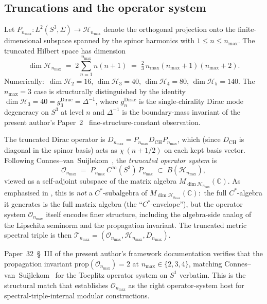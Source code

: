 \documentclass[11pt,a4paper]{article}
\theoremstyle{plain}
\theoremstyle{definition}
\newcommand{\nmax}{n_{\max}}
\newcommand{\sthree}{S^{3}}
\newcommand{\Hilb}{\mathcal{H}}
\newcommand{\Op}{\mathcal{O}}
\newcommand{\Tcal}{\mathcal{T}}
\newcommand{\C}{\mathbb{C}}
\newcommand{\Mat}{M}
\newcommand{\DCH}{D_{\mathrm{CH}}}
\begin{document}
\subsection{Truncations and the operator system}
\label{sec:truncations_recap}

Let $P_{\nmax}: L^2(\sthree, \Sigma) \to \Hilb_{\nmax}$ denote the
orthogonal projection onto the finite-dimensional subspace spanned by
the spinor harmonics with $1 \le n \le \nmax$. The truncated Hilbert
space has dimension
\begin{equation}\label{eq:dim_H_nmax}
   \dim \Hilb_{\nmax}
   \;=\; 2 \sum_{n=1}^{\nmax} n(n+1)
   \;=\; \tfrac{2}{3}\, \nmax(\nmax+1)(\nmax+2).
\end{equation}
Numerically:\ $\dim \Hilb_2 = 16$, $\dim \Hilb_3 = 40$,
$\dim \Hilb_4 = 80$, $\dim \Hilb_5 = 140$. The $\nmax = 3$ case is
structurally distinguished by the identity $\dim \Hilb_3 = 40 =
g_3^{\mathrm{Dirac}} = \Delta^{-1}$, where $g_n^{\mathrm{Dirac}}$ is
the single-chirality Dirac mode degeneracy on $\sthree$ at level $n$
and $\Delta^{-1}$ is the boundary-mass invariant of the present
author's Paper~2~\cite{paper2} fine-structure-constant observation.

The truncated Dirac operator is $D_{\nmax} = P_{\nmax} \DCH P_{\nmax}$,
which (since $\DCH$ is diagonal in the spinor basis) acts as
$\chi\,(n + 1/2)$ on each kept basis vector. Following
Connes--van~Suijlekom~\cite{connes_vs2021}, the \emph{truncated
operator system} is
\begin{equation}\label{eq:O_def}
   \Op_{\nmax}
   \;=\; P_{\nmax}\, C^\infty(\sthree)\, P_{\nmax}
   \;\subset\; B(\Hilb_{\nmax}),
\end{equation}
viewed as a self-adjoint subspace of the matrix algebra
$\Mat_{\dim \Hilb_{\nmax}}(\C)$. As emphasised in
\cite[\S 1]{connes_vs2021}, this is \emph{not} a $C^*$-subalgebra of
$\Mat_{\dim \Hilb_{\nmax}}(\C)$:\ the full $C^*$-algebra it generates
is the full matrix algebra (the ``$C^*$-envelope''), but the operator
system $\Op_{\nmax}$ itself encodes finer structure, including the
algebra-side analog of the Lipschitz seminorm and the propagation
invariant. The truncated metric spectral triple is then
$\Tcal_{\nmax} = (\Op_{\nmax}, \Hilb_{\nmax}, D_{\nmax})$.

Paper~32~\S~III of the present author's framework documentation
verifies that the propagation invariant
$\mathrm{prop}(\Op_{\nmax}) = 2$ at $\nmax \in \{2, 3, 4\}$, matching
Connes--van~Suijlekom~\cite[Prop.~4.2]{connes_vs2021} for the
Toeplitz operator system on $S^1$ verbatim. This is the structural
match that establishes $\Op_{\nmax}$ as the right operator-system
host for spectral-triple-internal modular constructions.
\end{document}
